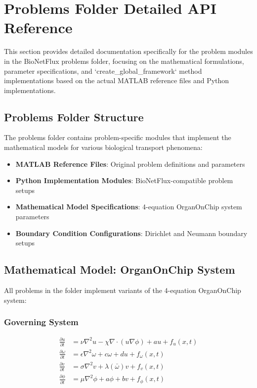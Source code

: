 %

\section{Problems Folder Detailed API Reference}
\label{sec:problems_folder_detailed_api}

This section provides detailed documentation specifically for the problem modules in the BioNetFlux problems folder, focusing on the mathematical formulations, parameter specifications, and `create\_global\_framework` method implementations based on the actual MATLAB reference files and Python implementations.

\subsection{Problems Folder Structure}

The problems folder contains problem-specific modules that implement the mathematical models for various biological transport phenomena:

\begin{itemize}
    \item \textbf{MATLAB Reference Files}: Original problem definitions and parameters
    \item \textbf{Python Implementation Modules}: BioNetFlux-compatible problem setups
    \item \textbf{Mathematical Model Specifications}: 4-equation OrganOnChip system parameters
    \item \textbf{Boundary Condition Configurations}: Dirichlet and Neumann boundary setups
\end{itemize}

\subsection{Mathematical Model: OrganOnChip System}
\label{subsec:ooc_mathematical_system}

All problems in the folder implement variants of the 4-equation OrganOnChip system:

\subsubsection{Governing System}

\begin{align}
\frac{\partial u}{\partial t} &= \nu \nabla^2 u - \chi \nabla \cdot (u \nabla \phi) + a u + f_u(x,t) \label{eq:u_equation}\\
\frac{\partial \omega}{\partial t} &= \epsilon \nabla^2 \omega + c \omega + d u + f_\omega(x,t) \label{eq:omega_equation}\\
\frac{\partial v}{\partial t} &= \sigma \nabla^2 v + \lambda(\bar{\omega}) v + f_v(x,t) \label{eq:v_equation}\\
\frac{\partial \phi}{\partial t} &= \mu \nabla^2 \phi + a \phi + b v + f_\phi(x,t) \label{eq:phi_equation}
\end{align}

